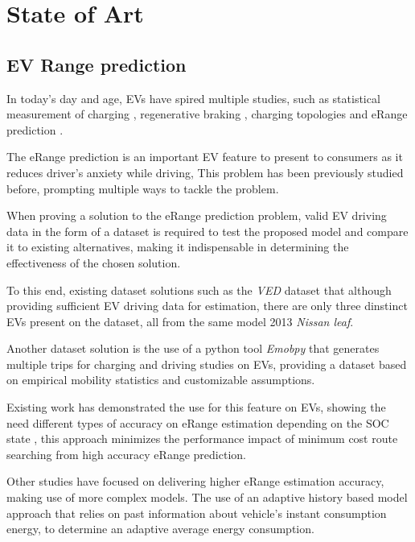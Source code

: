 \chapter{State of Art}
\label{cha:stateOfArt}

\section{EV Range prediction} 

In today's day and age, \gls{EV}s have spired
multiple studies, such as statistical
measurement of charging \citep{EVScout2},
regenerative braking \citep{regenerativeBraking},
charging topologies \citep{batteryChargerTopologies} 
and \gls{eRange} prediction \citep{predictionOfeRange}.

The \gls{eRange} prediction is an important 
\gls{EV} feature to present to consumers as
it reduces driver's anxiety while driving,
This problem has been previously studied before,
prompting multiple ways to tackle the problem.

When proving a solution to the \gls{eRange}
prediction problem, valid \gls{EV} driving data 
in the form of a \gls{dataset} is required to test
the proposed model and compare it to existing
alternatives, making it indispensable in 
determining the effectiveness of the chosen 
solution.

To this end, existing \gls{dataset} solutions
such as the \textit{VED} \gls{dataset} \citep{vedDataset}
that although providing sufficient \gls{EV} driving
data for estimation, there are only three dinstinct 
\gls{EVs} present on the \gls{dataset}, all from the 
same model 2013 \textit{Nissan leaf}.


Another \gls{dataset} solution is the use of 
a \gls{python} tool \textit{Emobpy} \citep{emobpy}
that generates multiple trips for charging and driving
studies on \gls{EVs}, providing a \gls{dataset}
based on empirical mobility statistics and 
customizable assumptions.


Existing work has demonstrated the use for 
this feature on \gls{EV}s, showing the need
different types of accuracy on \gls{eRange}
estimation depending on the \gls{SOC} state \citep{eRange},
this approach minimizes the performance impact
of minimum cost route searching from high accuracy
\gls{eRange} prediction.

Other studies have focused on delivering 
higher \gls{eRange} estimation accuracy,
making use of more complex models. 
The use of an adaptive history based model 
approach \citep{classicEVX} that relies on
past information about vehicle's instant 
consumption energy, to determine an
adaptive average energy consumption.

